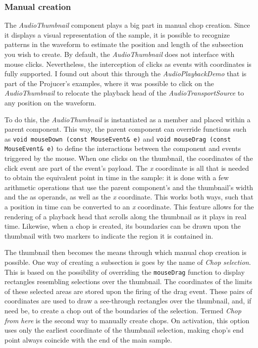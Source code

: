 \documentclass[12pt, a4paper, hidelinks]{article}
\begin{document}
	\subsubsection{Manual creation}
	The \textit{AudioThumbnail} component plays a big part in manual chop creation. Since it displays a visual representation of the sample, it is possible to recognize patterns in the waveform to estimate the position and length of the subsection you wish to create. By default, the \textit{AudioThumbnail} does not interface with mouse clicks. Nevertheless, the interception of clicks as events with coordinates is fully supported. I found out about this through the \textit{AudioPlaybackDemo} that is part of the Projucer's examples, where it was possible to click on the \textit{AudioThumbnail} to relocate the playback head of the \textit{AudioTransportSource} to any position on the waveform. \par 
	To do this, the \textit{AudioThumbnail} is instantiated as a member and placed within a parent component. This way, the parent component can override functions such as \texttt{void mouseDown (const MouseEvent\& e)} and \texttt{void mouseDrag (const MouseEvent\& e)} to define the interactions between the component and events triggered by the mouse. When one clicks on the thumbnail, the coordinates of the click event are part of the event's payload. The \textit{x} coordinate is all that is needed to obtain the equivalent point in time in the sample: it is done with a few arithmetic operations that use the parent component's and the thumbnail's width and the as operands, as well as the \textit{x} coordinate. This works both ways, such that a position in time can be converted to an \textit{x} coordinate. This feature allows for the rendering of a playback head that scrolls along the thumbnail as it plays in real time. Likewise, when a chop is created, its boundaries can be drawn upon the thumbnail with two markers to indicate the region it is contained in.
	\par
	The thumbnail then becomes the means through which manual chop creation is possible. One way of creating a subsection is goes by the name of \textit{Chop selection}. This is based on the possibility of overriding the \texttt{mouseDrag} function to display rectangles resembling selections over the thumbnail. The coordinates of the limits of these selected areas are stored upon the firing of the drag event. These pairs of coordinates are used to draw a see-through rectangles over the thumbnail, and, if need be, to create a chop out of the boundaries of the selection. Termed \textit{Chop from here} is the second way to manually create chops. On activation, this option uses only the earliest coordinate of the thumbnail selection, making chop's end point always coincide with the end of the main sample. \par
\end{document}
